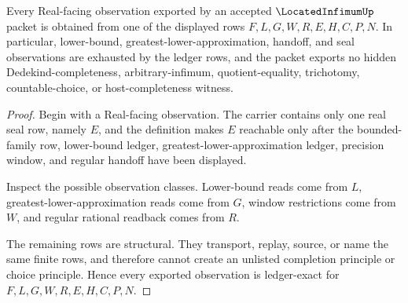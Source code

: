 \begin{theorem}
\label{thm:located-infimum-ledger-exactness}
Every Real-facing observation exported by an accepted $\LocatedInfimumUp$ packet is obtained from one of the displayed rows $F,L,G,W,R,E,H,C,P,N$. In particular, lower-bound, greatest-lower-approximation, handoff, and seal observations are exhausted by the ledger rows, and the packet exports no hidden Dedekind-completeness, arbitrary-infimum, quotient-equality, trichotomy, countable-choice, or host-completeness witness.
\end{theorem}
\begin{proof}
Begin with a Real-facing observation. The carrier contains only one real seal row, namely $E$, and the definition makes $E$ reachable only after the bounded-family row, lower-bound ledger, greatest-lower-approximation ledger, precision window, and regular handoff have been displayed.

Inspect the possible observation classes. Lower-bound reads come from $L$, greatest-lower-approximation reads come from $G$, window restrictions come from $W$, and regular rational readback comes from $R$.

The remaining rows are structural. They transport, replay, source, or name the same finite rows, and therefore cannot create an unlisted completion principle or choice principle. Hence every exported observation is ledger-exact for $F,L,G,W,R,E,H,C,P,N$.
\end{proof}

